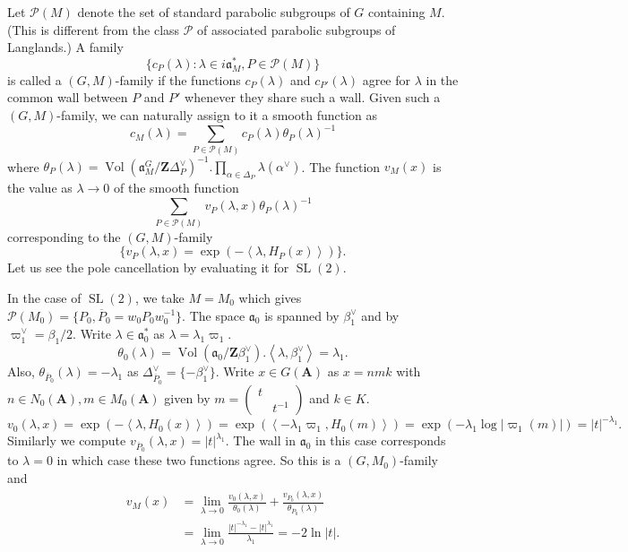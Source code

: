 \documentclass[11pt]{amsart}
\def\A{\mathbf A}
\def\Z{\mathbf Z}
\def\PPP{\mathcal P}
\def\aaa{\mathfrak a}
\def\cb#1{{\color{black}#1}}
\def\mod#1{\lvert #1 \rvert} %
\def\oP{\overline{P}}
\def\sl{\operatorname{SL}}
\def\sprod#1#2{\left\langle #1 , #2 \right\rangle}  %
\def\vol{\operatorname{Vol}}
\theoremstyle{remark}
\begin{document}
Let $\PPP(M)$ denote the set of standard parabolic subgroups of $G$ containing $M$. (This is different from the class $\PPP$ of associated parabolic subgroups of Langlands.) A family 
\[ \{c_P(\lambda) : \lambda \in i\aaa_M^*, P \in \PPP(M)\} \]
is called a $(G, M)$-family if the functions $c_P(\lambda)$ and $c_{P'}(\lambda)$ agree for $\lambda$ in the common wall between $P$ and $P'$ whenever they share such a wall. Given such a $(G, M)$-family, we can naturally assign to it a smooth function as
\[ c_M(\lambda) = \sum_{P \in \PPP(M)} c_P(\lambda) \theta_P(\lambda)^{-1} \]
where $\theta_P(\lambda) = \vol(\aaa_M^G / \Z \Delta_P^\vee)^{-1} . \displaystyle\prod_{\alpha \in \Delta_P} \lambda(\alpha^\vee)$. The function $v_M(x)$ is the value as $\lambda \to 0$ of the smooth function
\[ \sum_{P \in \PPP(M)} v_P(\lambda, x) \theta_P(\lambda)^{-1} \]
corresponding to the $(G, M)$-family 
\[ \{ v_P(\lambda, x) = \exp(-\sprod{\lambda}{H_P(x)}) \}. \]
Let us see the pole cancellation by evaluating it for $\sl(2)$. 

\cb{
In the case of $\sl(2)$, we take $M = M_0$ which gives $\PPP(M_0) = \{ P_0, \oP_0 = w_0 P_0 w_0^{-1} \}$. The space $\aaa_0$ is spanned by $\beta_1^\vee$ and by $\varpi_1^\vee = \beta_1 / 2$. Write $\lambda \in \aaa_0^*$ as $\lambda = \lambda_1 \varpi_1$. 
\[ \theta_0(\lambda) = \vol(\aaa_0/\Z \beta_1^\vee) . \sprod{\lambda}{\beta_1^\vee} = \lambda_1. \]
Also, $\theta_{\oP_0}(\lambda) = -\lambda_1$ as $\Delta_{\oP_0}^\vee = \{ -\beta_1^\vee\}$. Write $x \in G(\A)$ as $x = nmk$ with $n \in N_0(\A), m \in M_0(\A)$ given by $m = \begin{pmatrix} t & \\ & t^{-1} \end{pmatrix}$ and $k \in K$. 
\[ v_0(\lambda, x) = \exp(-\sprod{\lambda}{H_0(x)}) = \exp(\sprod{-\lambda_1 \varpi_1}{H_0(m)}) = \exp(-\lambda_1 \log \mod{\varpi_1(m)}) = \mod{t}^{-\lambda_1}. \]
Similarly we compute $v_{\oP_0}(\lambda, x) = \mod{t}^{\lambda_1}$. The wall in $\aaa_0$ in this case corresponds to $\lambda = 0$ in which case these two functions agree. So this is a $(G, M_0)$-family and 
\begin{align*}
	v_M(x) & = \lim_{\lambda \to 0} \frac{v_0(\lambda, x)}{\theta_0(\lambda)} + \frac{v_{\oP_0}(\lambda, x)}{\theta_{\oP_0}(\lambda)} \\
			& = \lim_{\lambda \to 0} \frac{\mod{t}^{-\lambda_1} - \mod{t}^{\lambda_1}}{\lambda_1} = -2\ln \mod{t}.
\end{align*}
}
\end{document}

